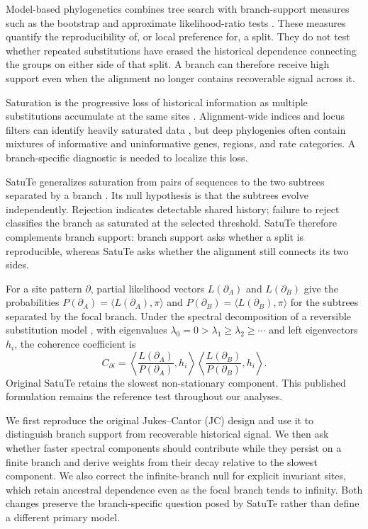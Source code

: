 Model-based phylogenetics combines tree search with branch-support measures such as the bootstrap and approximate likelihood-ratio tests \cite{felsenstein1985confidence,hoang2017,anisimova2006,minh2020iqtree}. These measures quantify the reproducibility of, or local preference for, a split. They do not test whether repeated substitutions have erased the historical dependence connecting the groups on either side of that split. A branch can therefore receive high support even when the alignment no longer contains recoverable signal across it.

Saturation is the progressive loss of historical information as multiple substitutions accumulate at the same sites \cite{philippe2011,ho2004}. Alignment-wide indices and locus filters can identify heavily saturated data \cite{xia2003index,duchene2021}, but deep phylogenies often contain mixtures of informative and uninformative genes, regions, and rate categories. A branch-specific diagnostic is needed to localize this loss.

SatuTe generalizes saturation from pairs of sequences to the two subtrees separated by a branch \cite{manuel2025satute}. Its null hypothesis is that the subtrees evolve independently. Rejection indicates detectable shared history; failure to reject classifies the branch as saturated at the selected threshold. SatuTe therefore complements branch support: branch support asks whether a split is reproducible, whereas SatuTe asks whether the alignment still connects its two sides.

For a site pattern \(\partial\), partial likelihood vectors \(L(\partial_A)\) and \(L(\partial_B)\) give the probabilities \(P(\partial_A)=\langle L(\partial_A),\pi\rangle\) and \(P(\partial_B)=\langle L(\partial_B),\pi\rangle\) for the subtrees separated by the focal branch. Under the spectral decomposition of a reversible substitution model \cite{levin2017,tavare1986}, with eigenvalues \(\lambda_0=0>\lambda_1\geq\lambda_2\geq\cdots\) and left eigenvectors \(h_i\), the coherence coefficient is
\begin{equation}
C_{\partial i}
=
\left\langle \frac{L(\partial_A)}{P(\partial_A)},h_i\right\rangle
\left\langle \frac{L(\partial_B)}{P(\partial_B)},h_i\right\rangle .
\label{eq-coherence}
\end{equation}
Original SatuTe retains the slowest non-stationary component. This published formulation remains the reference test throughout our analyses.

We first reproduce the original Jukes--Cantor (JC) design and use it to distinguish branch support from recoverable historical signal. We then ask whether faster spectral components should contribute while they persist on a finite branch and derive weights from their decay relative to the slowest component. We also correct the infinite-branch null for explicit invariant sites, which retain ancestral dependence even as the focal branch tends to infinity. Both changes preserve the branch-specific question posed by SatuTe rather than define a different primary model.

